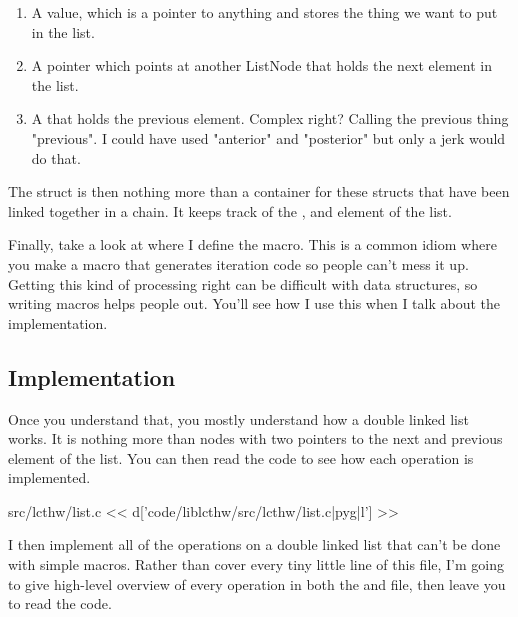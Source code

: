 \begin{enumerate}
\item A value, which is a pointer to anything and stores the thing we want
    to put in the list.
\item A  pointer which points at another ListNode 
    that holds the next element in the list.
\item A  that holds the previous element.  Complex
    right?  Calling the previous thing "previous".  I could have used
    "anterior" and "posterior" but only a jerk would do that.
\end{enumerate}

The  struct is then nothing more than a container for these
 structs that have been linked together in a chain.
It keeps track of the ,  and 
element of the list.

Finally, take a look at  where I define
the  macro.  This is a common idiom where you
make a macro that generates iteration code so people can't mess
it up.  Getting this kind of processing right can be difficult with
data structures, so writing macros helps people out.  You'll see
how I use this when I talk about the implementation.

\subsection{Implementation}

Once you understand that, you mostly understand how a double linked list
works.  It is nothing more than nodes with two pointers to the next and
previous element of the list.  You can then read the 
code to see how each operation is implemented.

\begin{code}{src/lcthw/list.c}
<< d['code/liblcthw/src/lcthw/list.c|pyg|l'] >>
\end{code}

I then implement all of the operations on a double linked list that can't
be done with simple macros.  Rather than cover every tiny little line of
this file, I'm going to give high-level overview of every operation
in both the  and  file, then leave you to read
the code.

